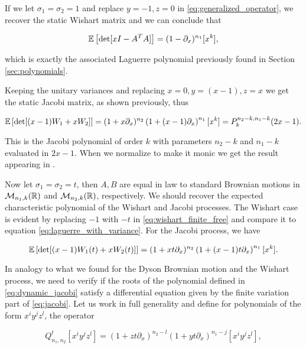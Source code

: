     If we let $\sigma_1 = \sigma_2 = 1$ and replace $y=-1, z=0$ in \eqref{eq:generalized_operator}, we recover the static Wishart matrix and we can conclude that

    \begin{equation} \label{eq:wishart_finite_free}
        \mathbb E \left[ \det[xI - A^TA] \right] = (1 - \partial_x)^{n_1}[x^k],
    \end{equation}

    \noindent which is exactly the associated Laguerre polynomial previously found in Section \ref{sec:polynomials}.

    Keeping the unitary variances and replacing $x=0, y=(x-1), z=x$ we get the static Jacobi matrix, as shown previously, thus 

    \begin{equation*}
        \mathbb E \left[ \det[(x-1)W_1 + xW_2] \right] = (1+x\partial_x)^{n_2} \left(1 + (x-1)\partial_x\right)^{n_1}[x^k] = P_k^{n_2 - k, n_1-k}(2x-1).
    \end{equation*}

    This is the Jacobi polynomial of order $k$ with parameters $n_2 - k$ and $n_1-k$ evaluated in $2x-1$. When we normalize to make it monic we get the result appearing in \cite{edelman1988eigenvalues}.

    Now let $\sigma_1= \sigma_2 = t$, then $A,B$ are equal in law to standard Brownian motions in $\mathcal M_{n_1,k}(\mathbb R)$ and $\mathcal M_{n_2,k}(\mathbb R)$, respectively. We should recover the expected characteristic polynomial of the Wishart and Jacobi processes. The Wishart case is evident by replacing $-1$ with $-t$ in \eqref{eq:wishart_finite_free} and compare it to equation \eqref{eq:laguerre_with_variance}. For the Jacobi process, we have

    \begin{equation} \label{eq:dynamic_jacobi}
        \mathbb E \left[ \det[(x-1)W_1(t) + xW_2(t)] \right] = (1+xt\partial_x)^{n_2} \left(1 + (x-1)t\partial_x\right)^{n_1}[x^k].
    \end{equation}

    In analogy to what we found for the Dyson Brownian motion and the Wishart process, we need to verify if the roots of the polynomial defined in \eqref{eq:dynamic_jacobi} satisfy a differential equation given by the finite variation part of \eqref{eq:jacobi}. Let us work in full generality and define for polynomials of the form $x^i y^j z^l$, the operator

    \begin{equation*}
        Q_{n_1,n_2}^t [x^i y^j z^l] = (1+zt\partial_x)^{n_2-l} \left(1 + yt\partial_x\right)^{n_1 - j}[x^i y^j z^l],
    \end{equation*}

